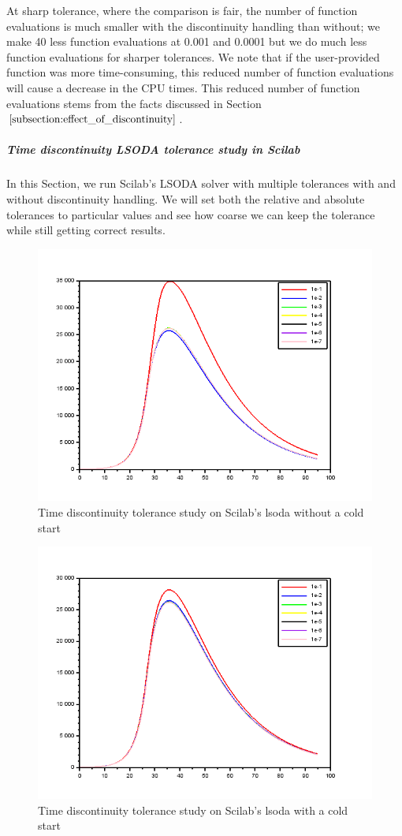 At sharp tolerance, where the comparison is fair, the number of function evaluations is much smaller with the discontinuity handling than without; we make 40 less function evaluations at 0.001 and 0.0001 but we do much less function evaluations for sharper tolerances. We note that if the user-provided function was more time-consuming, this reduced number of function evaluations will cause a decrease in the CPU times. This reduced number of function evaluations stems from the facts discussed in Section $\ref{subsection:effect_of_discontinuity}$. 

\subparagraph{Time discontinuity LSODA tolerance study in Scilab}
In this Section, we run Scilab's LSODA solver with multiple tolerances with and without discontinuity handling. We will set both the relative and absolute tolerances to particular values and see how coarse we can keep the tolerance while still getting correct results.

\begin{figure}[h]
	\centering
	\includegraphics[width=0.7\linewidth]{./figures/tolerance_time_lsoda_no_event_sci}
	\caption{Time discontinuity tolerance study on Scilab's lsoda without a cold start}
	\label{fig:tolerance_time_lsoda_no_event_sci}
\end{figure}

\begin{figure}[h]
	\centering
	\includegraphics[width=0.7\linewidth]{./figures/tolerance_time_lsoda_with_event_sci}
	\caption{Time discontinuity tolerance study on Scilab's lsoda with a cold start}
	\label{fig:tolerance_time_lsoda_with_event_sci}
\end{figure}


